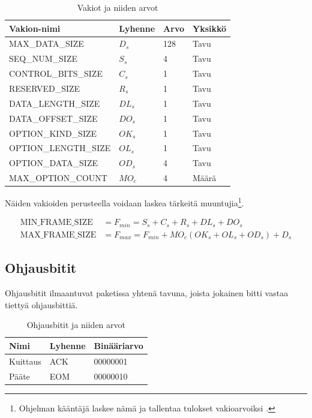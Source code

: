 \documentclass[a4paper,12pt]{article}
\begin{document}
    \begin{table}[h!]
        \centering
        \begin{tabular}{llll}
            Vakion-nimi & Lyhenne & Arvo & Yksikkö \\
            \hline
            MAX\_DATA\_SIZE & $D_s$ & 128 & Tavu \\
            SEQ\_NUM\_SIZE & $S_s$ & 4 & Tavu \\         
            CONTROL\_BITS\_SIZE & $C_s$ & 1 & Tavu \\         
            RESERVED\_SIZE & $R_s$ & 1 & Tavu \\         
            DATA\_LENGTH\_SIZE & $DL_s$ & 1 & Tavu \\         
            DATA\_OFFSET\_SIZE & $DO_s$ & 1 & Tavu \\         
            OPTION\_KIND\_SIZE & $OK_s$ & 1 & Tavu \\         
            OPTION\_LENGTH\_SIZE & $OL_s$ & 1 & Tavu \\         
            OPTION\_DATA\_SIZE & $OD_s$ & 4 & Tavu \\
            MAX\_OPTION\_COUNT & $MO_c$ & 4 & Määrä          
        \end{tabular}
        \caption{Vakiot ja niiden arvot}
        \label{tab:vakiot}
    \end{table}

    Näiden vakioiden perusteella voidaan laskea tärkeitä muuntujia\footnote{Ohjelman kääntäjä laskee nämä ja tallentaa tulokset vakioarvoiksi \cite{rust_book_constant_evaluation}.}.
    
    \begin{align}
        \text{MIN\_FRAME\_SIZE} &= F_{min} = S_s + C_s + R_s + DL_s + DO_s \\
        \text{MAX\_FRAME\_SIZE} &= F_{max} = F_{min} + MO_c(OK_s + OL_s + OD_s) + D_s \label{eq:fmax}
    \end{align}


    \subsection{Ohjausbitit}
    Ohjausbitit ilmaantuvat paketissa yhtenä tavuna, joista jokainen bitti vastaa tiettyä ohjausbittiä.

    \begin{table}[h!]
        \centering
        \begin{tabular}{lll}
            Nimi & Lyhenne & Binääriarvo \\
            \hline
            Kuittaus & ACK & 00000001 \\ 
            Pääte & EOM & 00000010 \\ 
        \end{tabular}
        \caption{Ohjausbitit ja niiden arvot}
        \label{tab:control_bits}
    \end{table}
\end{document}
